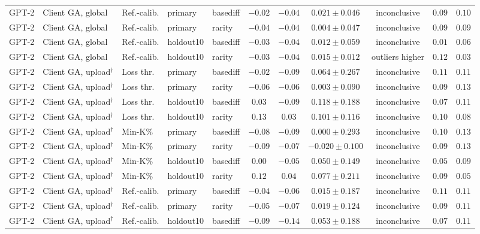 \begin{table}[t]
\begin{tabular*}{\textwidth}{@{\extracolsep{\fill}}lllllcccccc@{}}
GPT-2 & Client GA, global & Ref.-calib. & primary & basediff & $-0.02$ & $-0.04$ & $0.021 \pm 0.046$ & inconclusive & $0.09$ & $0.10$ \\
GPT-2 & Client GA, global & Ref.-calib. & primary & rarity & $-0.04$ & $-0.04$ & $0.004 \pm 0.047$ & inconclusive & $0.09$ & $0.09$ \\
GPT-2 & Client GA, global & Ref.-calib. & holdout10 & basediff & $-0.03$ & $-0.04$ & $0.012 \pm 0.059$ & inconclusive & $0.01$ & $0.06$ \\
GPT-2 & Client GA, global & Ref.-calib. & holdout10 & rarity & $-0.03$ & $-0.04$ & $0.015 \pm 0.012$ & outliers higher & $0.12$ & $0.03$ \\
GPT-2 & Client GA, upload$^{\dagger}$ & Loss thr. & primary & basediff & $-0.02$ & $-0.09$ & $0.064 \pm 0.267$ & inconclusive & $0.11$ & $0.11$ \\
GPT-2 & Client GA, upload$^{\dagger}$ & Loss thr. & primary & rarity & $-0.06$ & $-0.06$ & $0.003 \pm 0.090$ & inconclusive & $0.09$ & $0.13$ \\
GPT-2 & Client GA, upload$^{\dagger}$ & Loss thr. & holdout10 & basediff & $0.03$ & $-0.09$ & $0.118 \pm 0.188$ & inconclusive & $0.07$ & $0.11$ \\
GPT-2 & Client GA, upload$^{\dagger}$ & Loss thr. & holdout10 & rarity & $0.13$ & $0.03$ & $0.101 \pm 0.116$ & inconclusive & $0.10$ & $0.08$ \\
GPT-2 & Client GA, upload$^{\dagger}$ & Min-K\% & primary & basediff & $-0.08$ & $-0.09$ & $0.000 \pm 0.293$ & inconclusive & $0.10$ & $0.13$ \\
GPT-2 & Client GA, upload$^{\dagger}$ & Min-K\% & primary & rarity & $-0.09$ & $-0.07$ & $-0.020 \pm 0.100$ & inconclusive & $0.09$ & $0.13$ \\
GPT-2 & Client GA, upload$^{\dagger}$ & Min-K\% & holdout10 & basediff & $0.00$ & $-0.05$ & $0.050 \pm 0.149$ & inconclusive & $0.05$ & $0.09$ \\
GPT-2 & Client GA, upload$^{\dagger}$ & Min-K\% & holdout10 & rarity & $0.12$ & $0.04$ & $0.077 \pm 0.211$ & inconclusive & $0.09$ & $0.05$ \\
GPT-2 & Client GA, upload$^{\dagger}$ & Ref.-calib. & primary & basediff & $-0.04$ & $-0.06$ & $0.015 \pm 0.187$ & inconclusive & $0.11$ & $0.11$ \\
GPT-2 & Client GA, upload$^{\dagger}$ & Ref.-calib. & primary & rarity & $-0.05$ & $-0.07$ & $0.019 \pm 0.124$ & inconclusive & $0.09$ & $0.11$ \\
GPT-2 & Client GA, upload$^{\dagger}$ & Ref.-calib. & holdout10 & basediff & $-0.09$ & $-0.14$ & $0.053 \pm 0.188$ & inconclusive & $0.07$ & $0.11$ \\

\end{tabular*}
\end{table}
